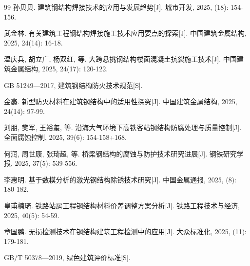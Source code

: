 \documentclass[UTF8,a4paper,10.5pt]{ctexart}
\begin{document}
\begin{thebibliography}{99}
孙贝贝. 建筑钢结构焊接技术的应用与发展趋势[J]. 城市开发, 2025, (18): 154-156.

武金林. 有关建筑工程钢结构焊接施工技术应用要点的探索[J]. 中国建筑金属结构, 2025, 24(14): 16-18.

温庆兵, 胡立广, 杨双红, 等. 大跨悬挑钢结构楼面混凝土抗裂施工技术[J]. 中国建筑金属结构, 2025, 24(17): 120-122.

GB 51249—2017, 建筑钢结构防火技术规范[S].

金鑫. 新型防火材料在建筑钢结构中的适用性探究[J]. 中国建筑金属结构, 2025, 24(14): 97-99.

刘朋, 樊军, 王裕玺, 等. 沿海大气环境下高铁客站钢结构防腐处理与质量控制[J]. 全面腐蚀控制, 2025, 39(6): 154-158+168.

何润, 周世康, 张琦超, 等. 桥梁钢结构的腐蚀与防护技术研究进展[J]. 钢铁研究学报, 2025, 37(5): 539-556.

李惠明. 基于数模分析的激光钢结构除锈技术研究[J]. 中国金属通报, 2025, (8): 180-182.

皇甫楠琦. 铁路站房工程钢结构材料价差调整方案分析[J]. 铁路工程技术与经济, 2025, 40(5): 54-59.

章国鹏. 无损检测技术在钢结构建筑工程检测中的应用[J]. 大众标准化, 2025, (11): 179-181.

GB/T 50378—2019, 绿色建筑评价标准[S].

\end{thebibliography}
\end{document}
